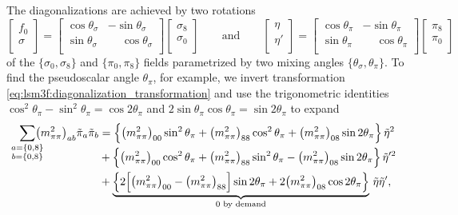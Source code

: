 The diagonalizations are achieved by two rotations
\begin{equation}
	\begin{bmatrix} f_0 \\ \sigma \\ \end{bmatrix} = \begin{bmatrix} \cos \theta_\sigma & -\sin \theta_\sigma \\ \sin \theta_\sigma & \phantom{-} \cos \theta_\sigma \\ \end{bmatrix} \begin{bmatrix} \sigma_8 \\ \sigma_0 \\ \end{bmatrix}
	\qquad \text{and} \qquad
	\begin{bmatrix} \eta \\ \eta' \\ \end{bmatrix} = \begin{bmatrix} \cos \theta_\pi & -\sin \theta_\pi \\ \sin \theta_\pi & \phantom{-} \cos \theta_\pi \\ \end{bmatrix} \begin{bmatrix} \pi_8 \\ \pi_0 \\ \end{bmatrix}
	\label{eq:lsm3f:diagonalization_transformation}
\end{equation}
of the $\{\sigma_0, \sigma_8\}$ and $\{\pi_0, \pi_8\}$ fields parametrized by two mixing angles $\{\theta_\sigma, \theta_\pi\}$.
To find the pseudoscalar angle $\theta_\pi$, for example,
we invert transformation \eqref{eq:lsm3f:diagonalization_transformation} and use the trigonometric identities $\cos^2 \theta_\pi - \sin^2 \theta_\pi = \cos 2 \theta_\pi$ and $2 \sin\theta_\pi \cos\theta_\pi = \sin 2 \theta_\pi$ to expand
\begin{equation}
\begin{split}
	\smash{\smashoperator{\sum_{\substack{a=\{0,8\}\\b=\{0,8\}}}}} \big(m^2_{\pi\pi}\big)_{ab} \tilde{\pi}_a \tilde{\pi}_b &= \Big\{ \big(m^2_{\pi\pi}\big)_{00} \sin^2 \theta_\pi + \big(m^2_{\pi\pi}\big)_{88} \cos^2 \theta_\pi + \big(m^2_{\pi\pi}\big)_{08} \sin 2 \theta_\pi \Big\} \, \tilde{\eta}^2 \\
	                                                                                                                       &+ \Big\{ \big(m^2_{\pi\pi}\big)_{00} \cos^2 \theta_\pi + \big(m^2_{\pi\pi}\big)_{88} \sin^2 \theta_\pi - \big(m^2_{\pi\pi}\big)_{08} \sin 2 \theta_\pi \Big\} \, \tilde{\eta}'^2 \\
	                                                                                                                       &+ \underbrace{\Big\{ 2 \Big[ \big(m^2_{\pi\pi}\big)_{00} - \big(m^2_{\pi\pi}\big)_{88} \Big] \sin 2 \theta_\pi + 2 \big(m^2_{\pi\pi}\big)_{08} \cos 2 \theta_\pi \Big\}}_{\text{$0$ by demand}} \, \tilde{\eta} \tilde{\eta}' ,
\end{split}
\label{eq:lsm3f:diagonalization_sum}
\end{equation}
